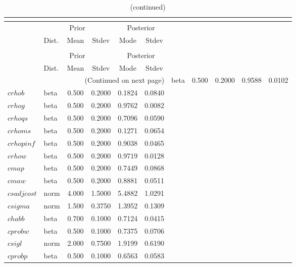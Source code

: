  
\begin{center}
\begin{longtable}{llcccc} 
\caption{Results from posterior maximization (parameters)}\\
 \label{Table:Posterior:1}\\
\toprule 
  & \multicolumn{3}{c}{Prior}  &  \multicolumn{2}{c}{Posterior} \\
  \cmidrule(r{.75em}){2-4} \cmidrule(r{.75em}){5-6}
  & Dist. & Mean  & Stdev & Mode & Stdev \\ 
\midrule \endfirsthead 
\caption{(continued)}\\
 \bottomrule 
  & \multicolumn{3}{c}{Prior}  &  \multicolumn{2}{c}{Posterior} \\
  \cmidrule(r{.75em}){2-4} \cmidrule(r{.75em}){5-6}
  & Dist. & Mean  & Stdev & Mode & Stdev \\ 
\midrule \endhead 
\bottomrule \multicolumn{6}{r}{(Continued on next page)}\endfoot 
\bottomrule\endlastfoot 
$crhoa$ & beta &   0.500 & 0.2000 &   0.9588 &  0.0102 \\ 
$crhob$ & beta &   0.500 & 0.2000 &   0.1824 &  0.0840 \\ 
$crhog$ & beta &   0.500 & 0.2000 &   0.9762 &  0.0082 \\ 
$crhoqs$ & beta &   0.500 & 0.2000 &   0.7096 &  0.0590 \\ 
$crhoms$ & beta &   0.500 & 0.2000 &   0.1271 &  0.0654 \\ 
$crhopinf$ & beta &   0.500 & 0.2000 &   0.9038 &  0.0465 \\ 
$crhow$ & beta &   0.500 & 0.2000 &   0.9719 &  0.0128 \\ 
$cmap$ & beta &   0.500 & 0.2000 &   0.7449 &  0.0868 \\ 
$cmaw$ & beta &   0.500 & 0.2000 &   0.8881 &  0.0511 \\ 
$csadjcost$ & norm &   4.000 & 1.5000 &   5.4882 &  1.0291 \\ 
$csigma$ & norm &   1.500 & 0.3750 &   1.3952 &  0.1309 \\ 
$chabb$ & beta &   0.700 & 0.1000 &   0.7124 &  0.0415 \\ 
$cprobw$ & beta &   0.500 & 0.1000 &   0.7375 &  0.0706 \\ 
$csigl$ & norm &   2.000 & 0.7500 &   1.9199 &  0.6190 \\ 
$cprobp$ & beta &   0.500 & 0.1000 &   0.6563 &  0.0583 \\ 

\end{longtable}
\end{center}
